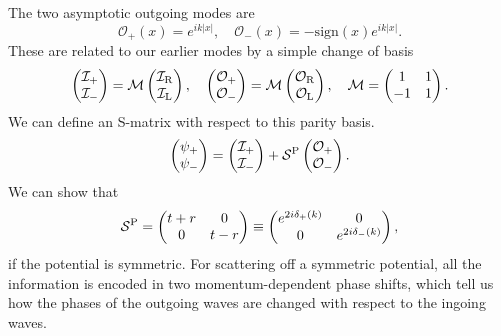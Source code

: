 The two asymptotic outgoing modes are
\[\mathcal{O}_{+}(x) = e^{ik|x|} , \quad \mathcal{O}_{-}(x) = -\mathrm{sign}(x) e^{ik|x|}.\]
These are related to our earlier modes by a simple change of basis
\[\begin{pmatrix}
\mathcal{I}_{+} \\ \mathcal{I}_{-}
\end{pmatrix} = \mathcal{M}\begin{pmatrix}
\mathcal{I}_{\rm R} \\ \mathcal{I}_{\rm L}
\end{pmatrix} , \quad \begin{pmatrix}
\mathcal{O}_{+} \\ \mathcal{O}_{-}
\end{pmatrix} = \mathcal{M}\begin{pmatrix}
\mathcal{O}_{\rm R} \\ \mathcal{O}_{\rm L}
\end{pmatrix} , \quad \mathcal{M} = \begin{pmatrix}
1 & 1 \\ -1 & 1
\end{pmatrix} .\]
We can define an S-matrix with respect to this parity basis.
\[\begin{pmatrix} \psi_{+} \\ \psi_{-} \end{pmatrix} =  
\begin{pmatrix} \mathcal{I}_{+} \\ \mathcal{I}_{-} \end{pmatrix} + 
\mathcal{S}^{\rm P} \begin{pmatrix} \mathcal{O}_{+} \\ \mathcal{O}_{-} \end{pmatrix}.\]
We can show that
\[\mathcal{S}^{\rm P} = \begin{pmatrix}
t + r & 0 \\ 0 & t - r
\end{pmatrix}  \equiv  \begin{pmatrix}
e^{2i\delta_+(k)} & 0 \\ 0 & e^{2i\delta_{-}(k)}
\end{pmatrix},\]
if the potential is symmetric. For scattering off a symmetric potential, all the information is encoded in two momentum-dependent phase shifts, which tell us how the phases of the outgoing waves are changed with respect to the ingoing waves.


